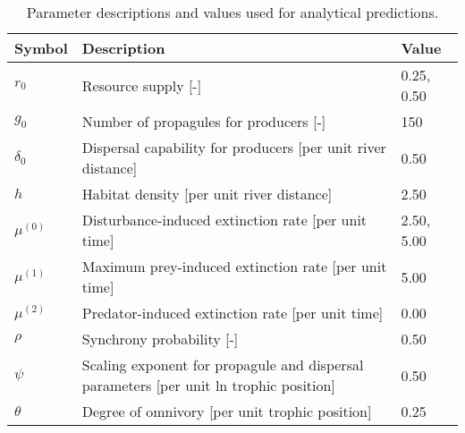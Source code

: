 \begin{table}[ht]
\centering
\caption{Parameter descriptions and values used for analytical predictions.} 
\label{tab:parms}
\begingroup\small
\begin{tabularx}{\textwidth}{lll}
  \hline
Symbol & Description & Value \\ 
  \hline
$r_0$ & Resource supply [-] & 0.25, 0.50 \\ 
  $g_0$ & Number of propagules for producers [-] & 150 \\ 
  $\delta_0$ & Dispersal capability for producers [per unit river distance] & 0.50 \\ 
  $h$ & Habitat density [per unit river distance] & 2.50 \\ 
  $\mu^{(0)}$ & Disturbance-induced extinction rate [per unit time] & 2.50, 5.00 \\ 
  $\mu^{(1)}$ & Maximum prey-induced extinction rate [per unit time] & 5.00 \\ 
  $\mu^{(2)}$ & Predator-induced extinction rate [per unit time] & 0.00 \\ 
  $\rho$ & Synchrony probability [-] & 0.50 \\ 
  $\psi$ & Scaling exponent for propagule and dispersal parameters [per unit ln trophic position] & 0.50 \\ 
  $\theta$ & Degree of omnivory [per unit trophic position] & 0.25 \\ 
   \hline
\end{tabularx}
\endgroup
\end{table}
